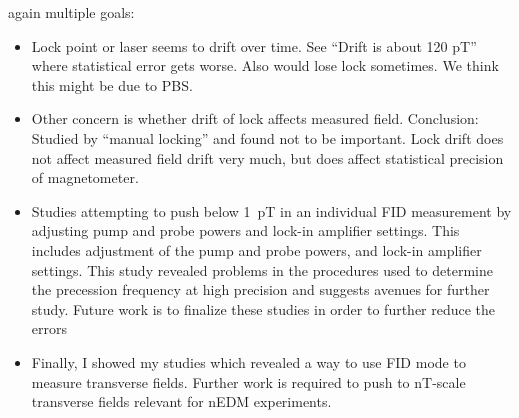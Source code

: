 again multiple goals:
 \begin{itemize}
   \item Lock point or laser seems to drift over time.  See ``Drift is
     about 120 pT'' where statistical error gets worse.  Also would
     lose lock sometimes.  We think this might be due to PBS.
    \item Other concern is whether drift of lock affects measured
      field.  Conclusion: Studied by ``manual locking'' and found not
      to be important.  Lock drift does not affect measured field
      drift very much, but does affect statistical precision of
      magnetometer.
\item Studies attempting to push below 1~pT in an individual FID
  measurement by adjusting pump and probe powers and lock-in amplifier
  settings.  This includes adjustment of the pump and probe powers,
  and lock-in amplifier settings.  This study revealed problems in the
  procedures used to determine the precession frequency at high
  precision and suggests avenues for further study.
  Future work is to finalize these studies in order to further reduce
  the errors
\item Finally, I showed my studies which revealed a way to use FID
  mode to measure transverse fields.  Further work is required to push
  to nT-scale transverse fields relevant for nEDM experiments.
\end{itemize}
